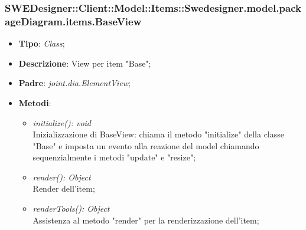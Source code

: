 \documentclass[../DefinizioneDiProdotto.tex]{subfiles}
\begin{document}
			
			\subsubsection{SWEDesigner::Client::Model::Items::Swedesigner.model.packageDiagram.items.BaseView}
			\hypertarget{SWEDesigner::Client::Model::Items::Swedesigner.model.packageDiagram.items.BaseView}{}
			\begin{itemize}
				\item \textbf{Tipo}: \emph{Class};
				\item \textbf{Descrizione}: View per item "Base";
				\item \textbf{Padre}: \emph{joint.dia.ElementView};
				\item \textbf{Metodi}:
				\begin{itemize}
					\item \emph{initialize(): void}\\
					Inizializzazione di BaseView: chiama il metodo "initialize" della classe "Base" e imposta un evento alla reazione del model chiamando sequenzialmente i metodi "update" e "resize";
					\item \emph{render(): Object}\\
					Render dell'item;
					\item \emph{renderTools(): Object}\\
					Assistenza al metodo "render" per la renderizzazione dell'item;
				\end{itemize}
			\end{itemize}
			
\end{document}
